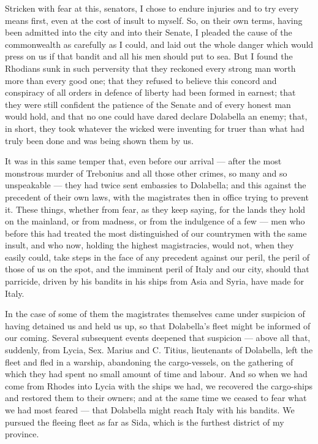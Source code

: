  Stricken with fear at this, senators, I chose to endure injuries and to try every means first, even at the cost of insult to myself. So, on their own terms, having been admitted into the city and into their Senate, I pleaded the cause of the commonwealth as carefully as I could, and laid out the whole danger which would press on us if that bandit and all his men should put to sea. But I found the Rhodians sunk in such perversity that they reckoned every strong man worth more than every good one; that they refused to believe this concord and conspiracy of all orders in defence of liberty had been formed in earnest; that they were still confident the patience of the Senate and of every honest man would hold, and that no one could have dared declare Dolabella an enemy; that, in short, they took whatever the wicked were inventing for truer than what had truly been done and was being shown them by us.

 It was in this same temper that, even before our arrival --- after the most monstrous murder of Trebonius and all those other crimes, so many and so unspeakable --- they had twice sent embassies to Dolabella; and this against the precedent of their own laws, with the magistrates then in office trying to prevent it. \dag{} These things, whether from fear, as they keep saying, for the lands they hold on the mainland, or from madness, or from the indulgence of a few --- men who before this had treated the most distinguished of our countrymen with the same insult, and who now, holding the highest magistracies, would not, when they easily could, take steps in the face of any precedent against our peril, the peril of those of us on the spot, and the imminent peril of Italy and our city, should that parricide, driven by his bandits in his ships from Asia and Syria, have made for Italy. \dag{}

 In the case of some of them the magistrates themselves came under suspicion of having detained us and held us up, so that Dolabella's fleet might be informed of our coming. Several subsequent events deepened that suspicion --- above all that, suddenly, from Lycia, Sex. Marius and C. Titius, lieutenants of Dolabella, left the fleet and fled in a warship, abandoning the cargo-vessels, on the gathering of which they had spent no small amount of time and labour. And so when we had come from Rhodes into Lycia with the ships we had, we recovered the cargo-ships and restored them to their owners; and at the same time we ceased to fear what we had most feared --- that Dolabella might reach Italy with his bandits. We pursued the fleeing fleet as far as Sida, which is the furthest district of my province.

